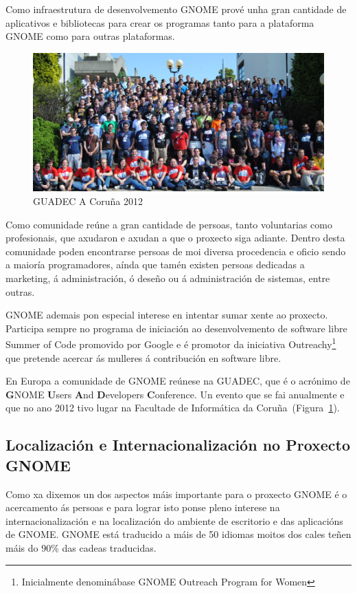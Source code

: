 Como infraestrutura de desenvolvemento GNOME prové unha gran cantidade de aplicativos e bibliotecas para crear os programas tanto para a plataforma GNOME como para outras plataformas.

\begin{figure}[h!]
    \centering
    \includegraphics[width=\textwidth]{img/guadec_2012.png}
    \caption{GUADEC A Coruña 2012}
    \label{fig:guadec2012}
\end{figure}

Como comunidade reúne a gran cantidade de persoas, tanto voluntarias como profesionais, que axudaron e axudan a que o proxecto siga adiante. Dentro desta comunidade poden encontrarse persoas de moi diversa procedencia e oficio sendo a maioría programadores, aínda que tamén existen persoas dedicadas a marketing, á administración, ó deseño ou á administración de sistemas, entre outras.

GNOME ademais pon especial interese en intentar sumar xente ao proxecto. Participa sempre no programa de iniciación ao desenvolvemento de software libre Summer of Code promovido por Google e é promotor da iniciativa Outreachy\footnote{Inicialmente denominábase GNOME Outreach Program for Women} que pretende acercar ás mulleres á contribución en software libre.

En Europa a comunidade de GNOME reúnese na GUADEC, que é o acrónimo de \textbf{G}NOME \textbf{U}sers \textbf{A}nd \textbf{D}evelopers \textbf{C}onference. Un evento que se fai anualmente e que no ano 2012 tivo lugar na Facultade de Informática da Coruña~(Figura~\ref{fig:guadec2012}).

\subsection{Localización e Internacionalización no Proxecto GNOME}
Como xa dixemos un dos aspectos máis importante para o proxecto GNOME é o acercamento ás persoas e para lograr isto ponse pleno interese na internacionalización e na localización do ambiente de escritorio e das aplicacións de GNOME. GNOME está traducido a máis de 50 idiomas moitos dos cales teñen máis do 90\% das cadeas traducidas.

